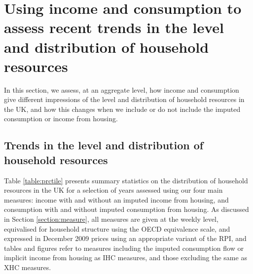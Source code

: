 \section{Using income and consumption to assess recent trends in the level and distribution of household resources}\label{sec:trends}

In this section, we assess, at an aggregate level, how income and consumption give different impressions of the level and distribution of household resources in the UK, and how this changes when we include or do not include the imputed consumption or income from housing.


\subsection{Trends in the level and distribution of household resources}

Table \ref{table:prctile} presents summary statistics on the distribution of household resources in the UK for a selection of years assessed using our four main measures: income with and without an imputed income from housing, and consumption with and without imputed consumption from housing. As discussed in Section \ref{section:measure}, all measures are given at the weekly level, equivalised for household structure using the OECD equivalence scale, and expressed in December 2009 prices using an appropriate variant of the RPI, and tables and figures refer to measures including the imputed consumption flow or implicit income from housing as IHC measures, and those excluding the same as XHC measures.  

